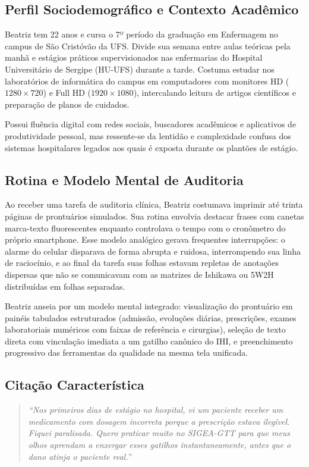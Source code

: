 \subsection{Perfil Sociodemográfico e Contexto Acadêmico}
Beatriz tem 22 anos e cursa o 7º período da graduação em Enfermagem no campus de São Cristóvão da UFS. Divide sua semana entre aulas teóricas pela manhã e estágios práticos supervisionados nas enfermarias do Hospital Universitário de Sergipe (HU-UFS) durante a tarde. Costuma estudar nos laboratórios de informática do campus em computadores com monitores HD ($1280 \times 720$) e Full HD ($1920 \times 1080$), intercalando leitura de artigos científicos e preparação de planos de cuidados.

Possui fluência digital com redes sociais, buscadores acadêmicos e aplicativos de produtividade pessoal, mas ressente-se da lentidão e complexidade confusa dos sistemas hospitalares legados aos quais é exposta durante os plantões de estágio.

\subsection{Rotina e Modelo Mental de Auditoria}
Ao receber uma tarefa de auditoria clínica, Beatriz costumava imprimir até trinta páginas de prontuários simulados. Sua rotina envolvia destacar frases com canetas marca-texto fluorescentes enquanto controlava o tempo com o cronômetro do próprio smartphone. Esse modelo analógico gerava frequentes interrupções: o alarme do celular disparava de forma abrupta e ruidosa, interrompendo sua linha de raciocínio, e ao final da tarefa suas folhas estavam repletas de anotações dispersas que não se comunicavam com as matrizes de Ishikawa ou 5W2H distribuídas em folhas separadas.

Beatriz anseia por um modelo mental integrado: visualização do prontuário em painéis tabulados estruturados (admissão, evoluções diárias, prescrições, exames laboratoriais numéricos com faixas de referência e cirurgias), seleção de texto direta com vinculação imediata a um gatilho canônico do IHI, e preenchimento progressivo das ferramentas da qualidade na mesma tela unificada.

\subsection{Citação Característica}
\begin{quote}
\textit{``Nos primeiros dias de estágio no hospital, vi um paciente receber um medicamento com dosagem incorreta porque a prescrição estava ilegível. Fiquei paralisada. Quero praticar muito no SIGEA-GTT para que meus olhos aprendam a enxergar esses gatilhos instantaneamente, antes que o dano atinja o paciente real.''}
\end{quote}

